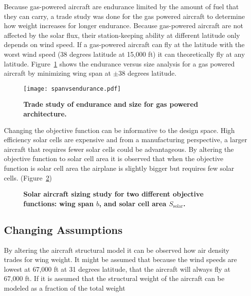 \documentclass[]{aiaa-tc}%
\begin{document}
Because gas-powered aircraft are endurance limited by the amount of fuel that they can carry, a trade study was done for the gas powered aircraft to determine how weight increases for longer endurance.
Because gas-powered aircraft are not affected by the solar flux, their station-keeping ability at different latitude only depends on wind speed. 
If a gas-powered aircraft can fly at the latitude with the worst wind speed (38 degrees latitude at 15,000 ft) it can theoretically fly at any latitude.  
Figure~\ref{f:spanvsendurance} shows the endurance versus size analysis for a gas powered aircraft by minimizing wing span at $\pm$38 degrees latitude.

\begin{figure}[H]
	\begin{center}
	\texttt{[image: spanvsendurance.pdf]}
    \caption{\textbf{Trade study of endurance and size for gas powered architecture.}}
	\label{f:spanvsendurance}
	\end{center}
\end{figure}

Changing the objective function can be informative to the design space. 
High efficiency solar cells are expensive and from a manufacturing perspective, a larger aircraft that requires fewer solar cells could be advantageous.
By altering the objective function to solar cell area it is observed that when the objective function is solar cell area the airplane is slightly bigger but requires few solar cells. (Figure~\ref{f:solarobjcomp})

\begin{figure}[H]
 \begin{subfigmatrix}{2}%
 \end{subfigmatrix}
    \caption{\textbf{Solar aircraft sizing study for two different objective functions: wing span $b$, and solar cell area $S_{\text{solar}}$.}}
    \label{f:solarobjcomp}
\end{figure}

\subsection{Changing Assumptions}

By altering the aircraft structural model it can be observed how air density trades for wing weight. 
It might be assumed that because the wind speeds are lowest at 67,000 ft at 31 degrees latitude, that the aircraft will always fly at 67,000 ft.  
If it is assumed that the structural weight of the aircraft can be modeled as a fraction of the total weight 
\end{document}
